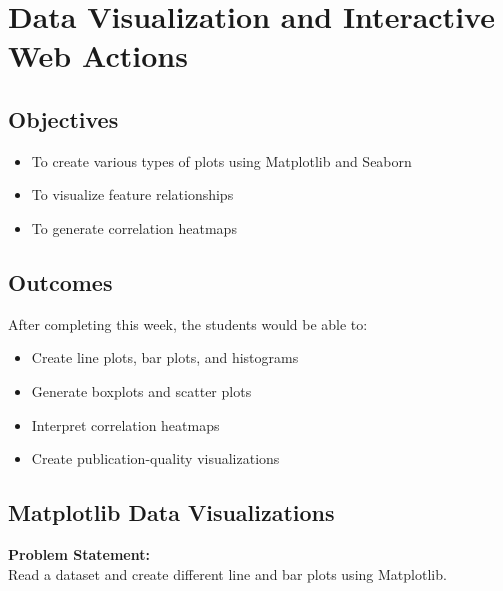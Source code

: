 \documentclass[a4paper,12pt]{article}
\begin{document}
\section{Data Visualization and Interactive Web Actions}

\subsection*{Objectives}
\begin{itemize}
    \item To create various types of plots using Matplotlib and Seaborn
    \item To visualize feature relationships
    \item To generate correlation heatmaps
\end{itemize}

\subsection*{Outcomes}
After completing this week, the students would be able to:
\begin{itemize}
    \item Create line plots, bar plots, and histograms
    \item Generate boxplots and scatter plots
    \item Interpret correlation heatmaps
    \item Create publication-quality visualizations
\end{itemize}

\subsection{Matplotlib Data Visualizations}
\textbf{Problem Statement:} \\
Read a dataset and create different line and bar plots using Matplotlib.
\end{document}
